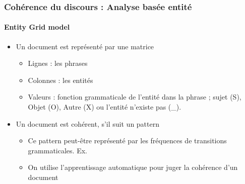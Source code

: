 \documentclass[xcolor=table]{beamer}
\begin{document}
\begin{frame}
	\frametitle{Cohérence du discours : Analyse basée entité}
	\framesubtitle{Entity Grid model}
	
	\begin{itemize}
		\item Un document est représenté par une matrice
		\begin{itemize}
			\item Lignes : les phrases 
			\item Colonnes : les entités
			\item Valeurs : fonction grammaticale de l'entité dans la phrase ; sujet (S), Objet (O), Autre (X) ou l'entité n'existe pas (\_).
		\end{itemize}
		\item Un document est cohérent, s'il suit un pattern
		\begin{itemize}
			\item Ce pattern peut-être représenté par les fréquences de transitions grammaticales. Ex. 
			\item On utilise l'apprentissage automatique pour juger la cohérence d'un document
		\end{itemize}
		
	\end{itemize}
	
\end{frame}
\end{document}
